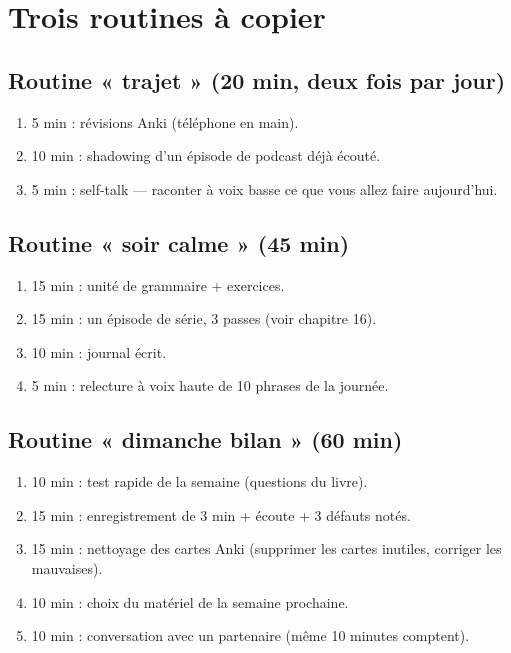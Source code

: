 \section{Trois routines à copier}

\subsection{Routine « trajet » (20 min, deux fois par jour)}
\begin{enumerate}
  \item 5 min : révisions Anki (téléphone en main).
  \item 10 min : shadowing d'un épisode de podcast déjà écouté.
  \item 5 min : self-talk --- raconter à voix basse ce que vous allez faire aujourd'hui.
\end{enumerate}

\subsection{Routine « soir calme » (45 min)}
\begin{enumerate}
  \item 15 min : unité de grammaire + exercices.
  \item 15 min : un épisode de série, 3 passes (voir chapitre 16).
  \item 10 min : journal écrit.
  \item 5 min : relecture à voix haute de 10 phrases de la journée.
\end{enumerate}

\subsection{Routine « dimanche bilan » (60 min)}
\begin{enumerate}
  \item 10 min : test rapide de la semaine (questions du livre).
  \item 15 min : enregistrement de 3 min + écoute + 3 défauts notés.
  \item 15 min : nettoyage des cartes Anki (supprimer les cartes inutiles, corriger les
  mauvaises).
  \item 10 min : choix du matériel de la semaine prochaine.
  \item 10 min : conversation avec un partenaire (même 10 minutes comptent).
\end{enumerate}

